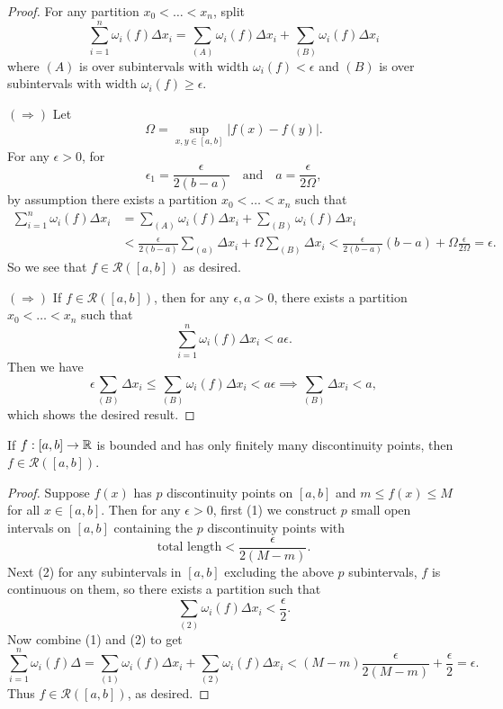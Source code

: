 \begin{proof}
  For any partition $x_0 < \dots < x_n$, split
  \[
    \sum_{i = 1}^n \omega_i(f) \Delta x_i =
    \sum_{(A)} \omega_i(f) \Delta x_i +
    \sum_{(B)} \omega_i(f) \Delta x_i
  \]
  where $(A)$ is over subintervals with width
  $\omega_i(f) < \epsilon$ and $(B)$ is over
  subintervals with width $\omega_i(f) \ge \epsilon$.

  $(\Rightarrow)$ Let
  \[
    \Omega = \sup_{x, y \in [a, b]} |f(x) - f(y)|.
  \]
  For any $\epsilon > 0$, for
  \[
    \epsilon_1 = \frac{\epsilon}{2(b - a)} \quad \text{and} \quad a = \frac{\epsilon}{2\Omega},
  \]
  by assumption there exists a partition
  $x_0 < \dots < x_n$ such that
  \begin{align*}
    \sum_{i = 1}^n \omega_i(f) \Delta x_i
    &= \sum_{(A)} \omega_i(f) \Delta x_i +
    \sum_{(B)} \omega_i(f) \Delta x_i \\
    &< \frac{\epsilon}{2(b - a)} \sum_{(a)} \Delta x_i
    + \Omega \sum_{(B)} \Delta x_i
    < \frac{\epsilon}{2(b - a)}(b - a) + \Omega \frac{\epsilon}{2\Omega} = \epsilon.
  \end{align*}
  So we see that $f \in \mathcal{R}([a, b])$ as desired.

  $(\Rightarrow)$ If $f \in \mathcal{R}([a, b])$, then
  for any $\epsilon , a > 0$, there exists a partition
  $x_0 < \dots < x_n$ such that
  \[
    \sum_{i = 1}^n \omega_i(f) \Delta x_i < a\epsilon.
  \]
  Then we have
  \[
    \epsilon \sum_{(B)} \Delta x_i
    \le \sum_{(B)} \omega_i(f) \Delta x_i
    < a\epsilon
    \implies \sum_{(B)} \Delta x_i < a,
  \]
  which shows the desired result.
\end{proof}

\begin{corollary}
  If $f : [a, b] \to \mathbb{R}$ is bounded and has
  only finitely many discontinuity points, then
  $f \in \mathcal{R}([a, b])$.
\end{corollary}

\begin{proof}
  Suppose $f(x)$ has $p$ discontinuity points on
  $[a, b]$ and $m \le f(x) \le M$ for all $x \in [a, b]$.
  Then for any $\epsilon > 0$, first (1) we construct $p$
  small open intervals on $[a, b]$ containing the $p$
  discontinuity points with
  \[
    \text{total length} < \frac{\epsilon}{2(M - m)}.
  \]
  Next (2) for any subintervals in $[a, b]$ excluding the above
  $p$ subintervals, $f$ is continuous on them, so
  there exists a partition such that
  \[
    \sum_{(2)} \omega_i(f) \Delta x_i < \frac{\epsilon}{2}.
  \]
  Now combine (1) and (2) to get
  \[
    \sum_{i = 1}^n \omega_i(f) \Delta
    = \sum_{(1)} \omega_i(f) \Delta x_i
    + \sum_{(2)} \omega_i(f) \Delta x_i
    < (M - m) \frac{\epsilon}{2(M - m)} + \frac{\epsilon}{2} = \epsilon.
  \]
  Thus $f \in \mathcal{R}([a, b])$, as desired.
\end{proof}

